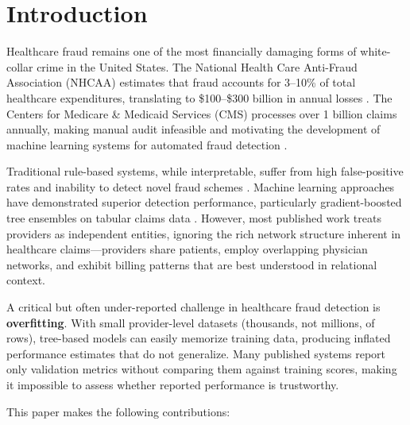 \documentclass[conference]{IEEEtran}
\begin{document}
\section{Introduction}

Healthcare fraud remains one of the most financially damaging forms of white-collar crime in the United States. The National Health Care Anti-Fraud Association (NHCAA) estimates that fraud accounts for 3--10\% of total healthcare expenditures, translating to \$100--\$300 billion in annual losses \cite{nhcaa2020}. The Centers for Medicare \& Medicaid Services (CMS) processes over 1 billion claims annually, making manual audit infeasible and motivating the development of machine learning systems for automated fraud detection \cite{bauder2017}.

Traditional rule-based systems, while interpretable, suffer from high false-positive rates and inability to detect novel fraud schemes \cite{herland2018}. Machine learning approaches have demonstrated superior detection performance, particularly gradient-boosted tree ensembles on tabular claims data \cite{johnson2023}. However, most published work treats providers as independent entities, ignoring the rich network structure inherent in healthcare claims---providers share patients, employ overlapping physician networks, and exhibit billing patterns that are best understood in relational context.

A critical but often under-reported challenge in healthcare fraud detection is \textbf{overfitting}. With small provider-level datasets (thousands, not millions, of rows), tree-based models can easily memorize training data, producing inflated performance estimates that do not generalize. Many published systems report only validation metrics without comparing them against training scores, making it impossible to assess whether reported performance is trustworthy.

This paper makes the following contributions:
\end{document}
